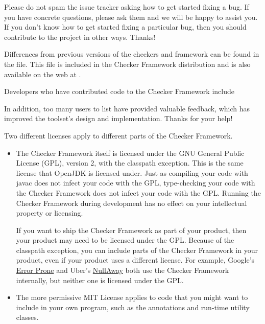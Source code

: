 Please do not spam the issue tracker asking how to get started fixing a
bug.  If you have concrete questions, please ask them and we will be happy
to assist you.  If you don't know how to get started fixing a particular
bug, then you should contribute to the project in other ways.  Thanks!



Differences from previous versions of the checkers and framework can be found
in the  file.  This file is included in the
Checker Framework distribution and is also available on the web at
.

Developers who have contributed code to the Checker Framework include


In addition, too many users to list have provided valuable feedback, which
has improved the toolset's design and implementation.
Thanks for your help!



Two different licenses apply to different parts of the Checker Framework.
\begin{itemize}
\item
The Checker Framework itself is licensed under the GNU General Public License
(GPL), version 2, with the classpath exception.
This is the same license that OpenJDK is licensed
under.  Just as compiling your code with javac does not infect your code
with the GPL, type-checking your code with the Checker Framework does not
infect your code with the GPL\@.  Running the Checker Framework during
development has no effect on your intellectual property or licensing.

If you want to ship the Checker Framework as part of your product, then
your product may need to be licensed under the GPL\@.  Because of the
classpath exception, you can include parts of the Checker Framework in your
product, even if your product uses a different license.  For example,
Google's \href{https://github.com/google/error-prone}{Error Prone} and
Uber's \href{https://github.com/uber/NullAway}{NullAway} both use the
Checker Framework internally, but neither one is licensed under the GPL\@.

\item
The more permissive MIT License applies
to code that you might want to include in your own
program, such as the annotations and run-time utility classes.
\end{itemize}

